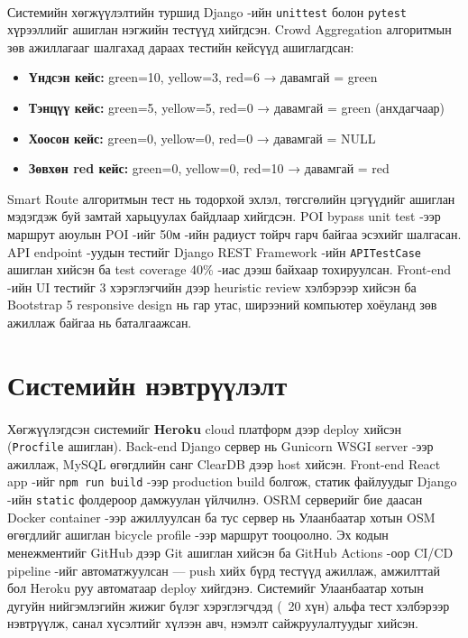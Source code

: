 \paragraph{} Системийн хөгжүүлэлтийн туршид Django -ийн \texttt{unittest} болон \texttt{pytest} хүрээллийг ашиглан нэгжийн тестүүд хийгдсэн. Crowd Aggregation алгоритмын зөв ажиллагааг шалгахад дараах тестийн кейсүүд ашиглагдсан:
\begin{itemize}
    \item \textbf{Үндсэн кейс:} green=10, yellow=3, red=6 → давамгай = green
    \item \textbf{Тэнцүү кейс:} green=5, yellow=5, red=0 → давамгай = green (анхдагчаар)
    \item \textbf{Хоосон кейс:} green=0, yellow=0, red=0 → давамгай = NULL
    \item \textbf{Зөвхөн red кейс:} green=0, yellow=0, red=10 → давамгай = red
\end{itemize}
Smart Route алгоритмын тест нь тодорхой эхлэл, төгсгөлийн цэгүүдийг ашиглан мэдэгдэж буй замтай харьцуулах байдлаар хийгдсэн. POI bypass unit test -ээр маршрут аюулын POI -ийг 50м -ийн радиуст тойрч гарч байгаа эсэхийг шалгасан. API endpoint -уудын тестийг Django REST Framework -ийн \texttt{APITestCase} ашиглан хийсэн ба test coverage 40\% -иас дээш байхаар тохируулсан. Front-end -ийн UI тестийг 3 хэрэглэгчийн дээр heuristic review хэлбэрээр хийсэн ба Bootstrap 5 responsive design нь гар утас, ширээний компьютер хоёуланд зөв ажиллаж байгаа нь баталгаажсан.

\section{Системийн нэвтрүүлэлт}
\paragraph{} Хөгжүүлэгдсэн системийг \textbf{Heroku} cloud платформ дээр deploy хийсэн (\texttt{Procfile} ашиглан). Back-end Django сервер нь Gunicorn WSGI server -ээр ажиллаж, MySQL өгөгдлийн санг ClearDB дээр host хийсэн. Front-end React app -ийг \texttt{npm run build} -ээр production build болгож, статик файлуудыг Django -ийн \texttt{static} фолдероор дамжуулан үйлчилнэ. OSRM серверийг бие даасан Docker container -ээр ажиллуулсан ба тус сервер нь Улаанбаатар хотын OSM өгөгдлийг ашиглан bicycle profile -ээр маршрут тооцоолно. Эх кодын менежментийг GitHub дээр Git ашиглан хийсэн ба GitHub Actions -оор CI/CD pipeline -ийг автоматжуулсан — push хийх бүрд тестүүд ажиллаж, амжилттай бол Heroku руу автоматаар deploy хийгдэнэ. Системийг Улаанбаатар хотын дугуйн нийгэмлэгийн жижиг бүлэг хэрэглэгчдэд (~20 хүн) альфа тест хэлбэрээр нэвтрүүлж, санал хүсэлтийг хүлээн авч, нэмэлт сайжруулалтуудыг хийсэн.

